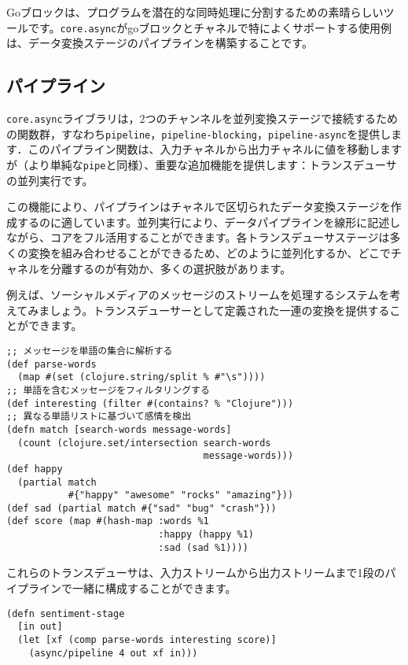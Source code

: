 Goブロックは、プログラムを潜在的な同時処理に分割するための素晴らしいツールです。\texttt{core.async}がgoブロックとチャネルで特によくサポートする使用例は、データ変換ステージのパイプラインを構築することです。

\subsection{パイプライン}

\texttt{core.async}ライブラリは，2つのチャンネルを並列変換ステージで接続するための関数群，すなわち\texttt{pipeline}，\texttt{pipeline-blocking}，\texttt{pipeline-async}を提供します．このパイプライン関数は、入力チャネルから出力チャネルに値を移動しますが（より単純な\texttt{pipe}と同様）、重要な追加機能を提供します：トランスデューサの並列実行です。

この機能により、パイプラインはチャネルで区切られたデータ変換ステージを作成するのに適しています。並列実行により、データパイプラインを線形に記述しながら、コアをフル活用することができます。各トランスデューサステージは多くの変換を組み合わせることができるため、どのように並列化するか、どこでチャネルを分離するのが有効か、多くの選択肢があります。

例えば、ソーシャルメディアのメッセージのストリームを処理するシステムを考えてみましょう。トランスデューサーとして定義された一連の変換を提供することができます。

\begin{lstlisting}[numbers=none]
;; メッセージを単語の集合に解析する
(def parse-words
  (map #(set (clojure.string/split % #"\s"))))
;; 単語を含むメッセージをフィルタリングする
(def interesting (filter #(contains? % "Clojure")))
;; 異なる単語リストに基づいて感情を検出
(defn match [search-words message-words]
  (count (clojure.set/intersection search-words
                                   message-words)))
(def happy
  (partial match
           #{"happy" "awesome" "rocks" "amazing"}))
(def sad (partial match #{"sad" "bug" "crash"}))
(def score (map #(hash-map :words %1
                           :happy (happy %1)
                           :sad (sad %1))))
\end{lstlisting}

これらのトランスデューサは、入力ストリームから出力ストリームまで1段のパイプラインで一緒に構成することができます。


\begin{lstlisting}[numbers=none]
(defn sentiment-stage
  [in out]
  (let [xf (comp parse-words interesting score)]
    (async/pipeline 4 out xf in)))
\end{lstlisting}

